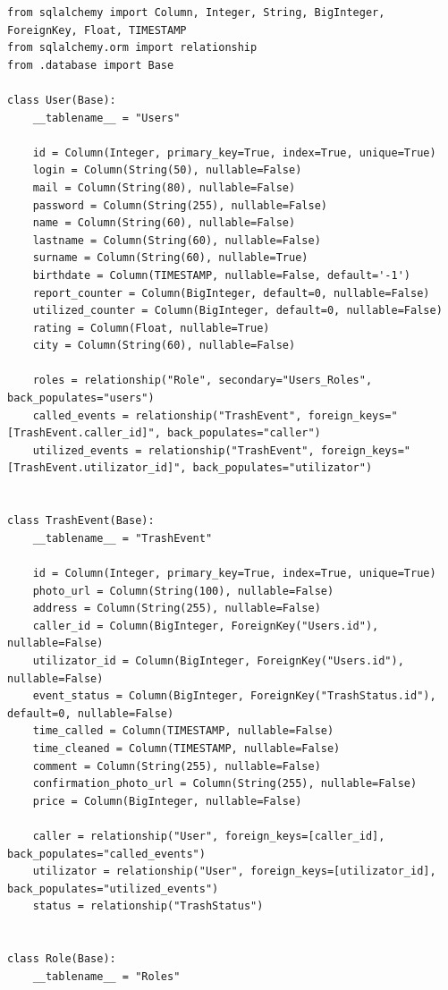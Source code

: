 \documentclass[coursework]{SCWorks}
\begin{document}
\begin{verbatim}
from sqlalchemy import Column, Integer, String, BigInteger, ForeignKey, Float, TIMESTAMP
from sqlalchemy.orm import relationship
from .database import Base

class User(Base):
    __tablename__ = "Users"

    id = Column(Integer, primary_key=True, index=True, unique=True)
    login = Column(String(50), nullable=False)
    mail = Column(String(80), nullable=False)
    password = Column(String(255), nullable=False)
    name = Column(String(60), nullable=False)
    lastname = Column(String(60), nullable=False)
    surname = Column(String(60), nullable=True)
    birthdate = Column(TIMESTAMP, nullable=False, default='-1')
    report_counter = Column(BigInteger, default=0, nullable=False)
    utilized_counter = Column(BigInteger, default=0, nullable=False)
    rating = Column(Float, nullable=True)
    city = Column(String(60), nullable=False)

    roles = relationship("Role", secondary="Users_Roles", back_populates="users")
    called_events = relationship("TrashEvent", foreign_keys="[TrashEvent.caller_id]", back_populates="caller")
    utilized_events = relationship("TrashEvent", foreign_keys="[TrashEvent.utilizator_id]", back_populates="utilizator")


class TrashEvent(Base):
    __tablename__ = "TrashEvent"

    id = Column(Integer, primary_key=True, index=True, unique=True)
    photo_url = Column(String(100), nullable=False)
    address = Column(String(255), nullable=False)
    caller_id = Column(BigInteger, ForeignKey("Users.id"), nullable=False)
    utilizator_id = Column(BigInteger, ForeignKey("Users.id"), nullable=False)
    event_status = Column(BigInteger, ForeignKey("TrashStatus.id"), default=0, nullable=False)
    time_called = Column(TIMESTAMP, nullable=False)
    time_cleaned = Column(TIMESTAMP, nullable=False)
    comment = Column(String(255), nullable=False)
    confirmation_photo_url = Column(String(255), nullable=False)
    price = Column(BigInteger, nullable=False)

    caller = relationship("User", foreign_keys=[caller_id], back_populates="called_events")
    utilizator = relationship("User", foreign_keys=[utilizator_id], back_populates="utilized_events")
    status = relationship("TrashStatus")


class Role(Base):
    __tablename__ = "Roles"


\end{verbatim}
\end{document}
